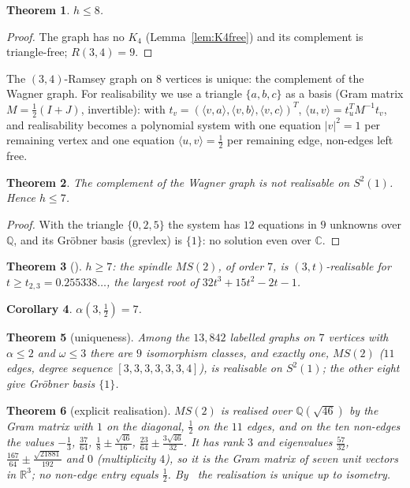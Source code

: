 \documentclass[11pt,a4paper]{amsart}
\newtheorem{theorem}{Theorem}[section]
\newtheorem{corollary}[theorem]{Corollary}
\theoremstyle{remark}
\newcommand{\Q}{\mathbb{Q}}
\newcommand{\R}{\mathbb{R}}
\newcommand{\C}{\mathbb{C}}
\begin{document}
\begin{theorem}\label{thm:h8}
$h\le8$.
\end{theorem}
\begin{proof}
The graph has no $K_4$ (Lemma~\ref{lem:K4free}) and its complement is triangle-free; $R(3,4)=9$.
\end{proof}

The $(3,4)$-Ramsey graph on $8$ vertices is unique: the complement of the Wagner graph. For realisability we use a triangle $\{a,b,c\}$ as a basis (Gram matrix $M=\tfrac12(I+J)$, invertible): with $t_v=(\langle v,a\rangle,\langle v,b\rangle,\langle v,c\rangle)^T$, $\langle u,v\rangle=t_u^TM^{-1}t_v$, and realisability becomes a polynomial system with one equation $|v|^2=1$ per remaining vertex and one equation $\langle u,v\rangle=\tfrac12$ per remaining edge, non-edges left free.

\begin{theorem}\label{thm:n8}
The complement of the Wagner graph is not realisable on $S^2(1)$. Hence $h\le7$.
\end{theorem}
\begin{proof}
With the triangle $\{0,2,5\}$ the system has $12$ equations in $9$ unknowns over $\Q$, and its Gr\"obner basis (grevlex) is $\{1\}$: no solution even over $\C$.
\end{proof}

\begin{theorem}[{\cite[Thm.~5.2(11)]{BBMO25}}]\label{thm:h7lower}
$h\ge7$: the spindle $MS(2)$, of order $7$, is $(3,t)$-realisable for $t\ge t_{2,3}=0.255338\ldots$, the largest root of $32t^3+15t^2-2t-1$.
\end{theorem}

\begin{corollary}
$\alpha(3,\tfrac12)=7$.
\end{corollary}

\begin{theorem}[uniqueness]\label{thm:unique7}
Among the $13{,}842$ labelled graphs on $7$ vertices with $\alpha\le2$ and $\omega\le3$ there are $9$ isomorphism classes, and exactly one, $MS(2)$ ($11$ edges, degree sequence $[3,3,3,3,3,3,4]$), is realisable on $S^2(1)$; the other eight give Gr\"obner basis $\{1\}$.
\end{theorem}

\begin{theorem}[explicit realisation]\label{thm:Q46}
$MS(2)$ is realised over $\Q(\sqrt{46})$ by the Gram matrix with $1$ on the diagonal, $\tfrac12$ on the $11$ edges, and on the ten non-edges the values $-\tfrac13$, $\tfrac{37}{64}$, $\tfrac18\pm\tfrac{\sqrt{46}}{16}$, $\tfrac{23}{64}\pm\tfrac{3\sqrt{46}}{32}$. It has rank $3$ and eigenvalues $\tfrac{57}{32}$, $\tfrac{167}{64}\pm\tfrac{\sqrt{21881}}{192}$ and $0$ (multiplicity $4$), so it is the Gram matrix of seven unit vectors in $\R^3$; no non-edge entry equals $\tfrac12$. By~\cite[Lemma 5.1]{BBMO25} the realisation is unique up to isometry.
\end{theorem}
\end{document}
